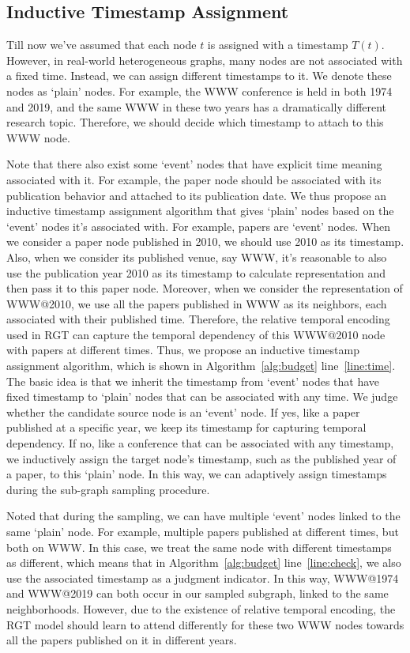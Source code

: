 \documentclass[sigconf]{acmart}
\theoremstyle{definition}
\begin{document}
{ 


\subsection{Inductive Timestamp Assignment}
Till now we've assumed that each node $t$ is assigned with a timestamp $T(t)$. However, in real-world heterogeneous graphs, many nodes are not associated with a fixed time. Instead, we can assign different timestamps to it. We denote these nodes as `plain' nodes. For example, the WWW conference is held in both 1974 and 2019, and the same WWW in these two years has a dramatically different research topic. Therefore, we should decide which timestamp to attach to this WWW node. 

Note that there also exist some `event' nodes that have explicit time meaning associated with it. For example, the paper node should be associated with its publication behavior and attached to its publication date. We thus propose an inductive timestamp assignment algorithm that gives `plain' nodes based on the `event' nodes it's associated with. For example, papers are `event' nodes. When we consider a paper node published in 2010, we should use 2010 as its timestamp. Also, when we consider its published venue, say WWW, it's reasonable to also use the publication year 2010 as its timestamp to calculate representation and then pass it to this paper node. Moreover, when we consider the representation of WWW@2010, we use all the papers published in WWW as its neighbors, each associated with their published time. Therefore, the relative temporal encoding used in RGT can capture the temporal dependency of this WWW@2010 node with papers at different times. Thus, we propose an inductive timestamp assignment algorithm, which is shown in Algorithm~\ref{alg:budget} line~\ref{line:time}. The basic idea is that we inherit the timestamp from `event' nodes that have fixed timestamp to `plain' nodes that can be associated with any time. We judge whether the candidate source node is an `event' node. If yes, like a paper published at a specific year, we keep its timestamp for capturing temporal dependency. If no, like a conference that can be associated with any timestamp, we inductively assign the target node's timestamp, such as the published year of a paper, to this `plain' node. In this way, we can adaptively assign timestamps during the sub-graph sampling procedure.


Noted that during the sampling, we can have multiple `event' nodes linked to the same `plain' node. For example, multiple papers published at different times, but both on WWW. In this case, we treat the same node with different timestamps as different, which means that in Algorithm~\ref{alg:budget} line~\ref{line:check}, we also use the associated timestamp as a judgment indicator. In this way, WWW@1974 and WWW@2019 can both occur in our sampled subgraph, linked to the same neighborhoods. However, due to the existence of relative temporal encoding, the RGT model should learn to attend differently for these two WWW nodes towards all the papers published on it in different years. 


}
\end{document}
